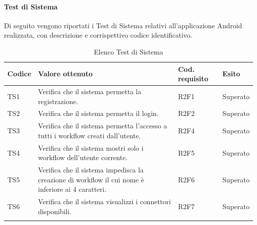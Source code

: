 \paragraph{Test di Sistema}
\label{sec:tsRQ}
Di seguito vengono riportati i Test di Sistema relativi all'applicazione Android realizzata, con descrizione e corrispettivo codice identificativo.
\begin{center}
	\centering
	\renewcommand{\arraystretch}{1.5}
	\begin{longtable}{  p{1.2cm}  p{8.5cm} p{2cm} p{1.5cm} }
		\rowcolor{tableHeadYellow}
		\textbf{Codice}   & \textbf{Valore ottenuto} & \textbf{Cod. \mbox{requisito}} & \textbf{Esito} \\ 
		\endhead
		TS1 & Verifica che il sistema permetta la registrazione. & R2F1 & Superato \\
		TS2 & Verifica che il sistema permetta il login. & R2F2 & Superato \\
		TS3 & Verifica che il sistema permetta l’accesso a tutti i workflow creati dall’utente. & R2F4 & Superato \\
		TS4 & Verifica che il sistema mostri solo i workflow dell’utente corrente. & R2F5 & Superato \\
		TS5 & Verifica che il sistema impedisca la creazione di workflow il cui nome è inferiore ai 4 caratteri. & R2F6 & Superato \\
		TS6 & Verifica che il sistema visualizzi i connettori disponibili. & R2F7 & Superato \\
		\rowcolor{white}
		\caption{Elenco Test di Sistema}
	\end{longtable}
\end{center}
\pagebreak
